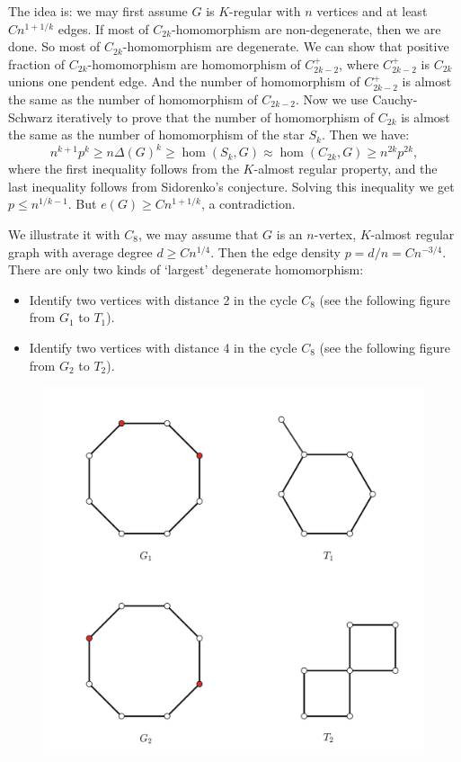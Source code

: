 \documentclass{article}
\theoremstyle{definition}
\begin{document}
The idea is: we may first assume $G$ is $K$-regular with $n$ vertices and at least $Cn^{1+1/k}$ edges. If most of $C_{2k}$-homomorphism are non-degenerate, then we are done. So most of $C_{2k}$-homomorphism are degenerate. We can show that positive fraction of $C_{2k}$-homomorphism are homomorphism of $C_{2k-2}^{+}$, where $C_{2k-2}^{+}$ is $C_{2k}$ unions one pendent edge. And the number of homomorphism of $C_{2k-2}^{+}$ is almost the same as the number of homomorphism of $C_{2k-2}$. Now we use Cauchy-Schwarz iteratively to prove that the number of homomorphism of $C_{2k}$ is almost the same as the number of homomorphism of the star $S_{k}$. Then we have:
$$n^{k+1}p^{k}\geq n\Delta(G)^{k}\geq\hom(S_{k},G)\approx\hom(C_{2k},G)\geq n^{2k}p^{2k},$$
where the first inequality follows from the $K$-almost regular property, and the last inequality follows from Sidorenko's conjecture. Solving this inequality we get $p\leq n^{1/k-1}$. But $e(G)\geq Cn^{1+1/k}$, a contradiction.

We illustrate it with $C_{8}$, we may assume that $G$ is an $n$-vertex, $K$-almost regular graph with average degree $d\geq Cn^{1/4}$. Then the edge density $p=d/n=Cn^{-3/4}$. There are only two kinds of `largest' degenerate homomorphism:

\begin{itemize}
    \item Identify two vertices with distance 2 in the cycle $C_{8}$ (see the following figure from $G_{1}$ to $T_{1}$).
    \item Identify two vertices with distance 4 in the cycle $C_{8}$ (see the following figure from $G_{2}$ to $T_{2}$).
\end{itemize}

\begin{figure}[H]
     \centering
     \includegraphics[scale=0.25]{11-4.png}
\end{figure}
\end{document}
